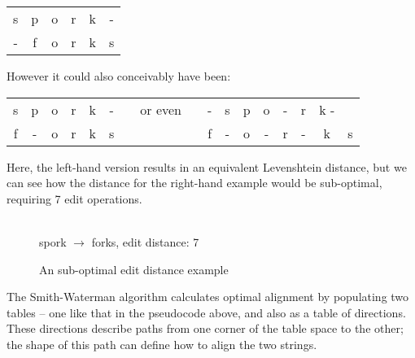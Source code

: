 \begin{center}
  \begin{tabular}{cccccc}
    s & p & o & r & k & -\\
    - & f & o & r & k & s 
  \end{tabular}
\end{center}

However it could also conceivably have been:

\begin{center}
  \begin{tabular}{ccccccccccccccccc}
    s & p & o & r & k & - & & or even & & - & s & p & o & - & r & k - &\\
    f & - & o & r & k & s & &         & & f & - & o & - & r & - & k & s    
  \end{tabular}
\end{center}\label{fig:sub-opt}

Here, the left-hand version results in an equivalent Levenshtein
distance, but we can see how the distance for the right-hand example
would be sub-optimal, requiring 7 edit operations.

\begin{figure}[h]
  \centering   
  \\
  \vspace{3 mm}
  spork $\rightarrow$ forks, edit distance: 7
  \caption{An sub-optimal edit distance example}
  \label{fig:fork-spork-subopt}
\end{figure}

The Smith-Waterman algorithm calculates optimal alignment by
populating two tables -- one like that in the pseudocode above, and
also as a table of directions.\cite{smithwaterman} These directions describe paths from
one corner of the table space to the other; the shape of this path
can define how to align the two strings.\cite{Smith1981}

